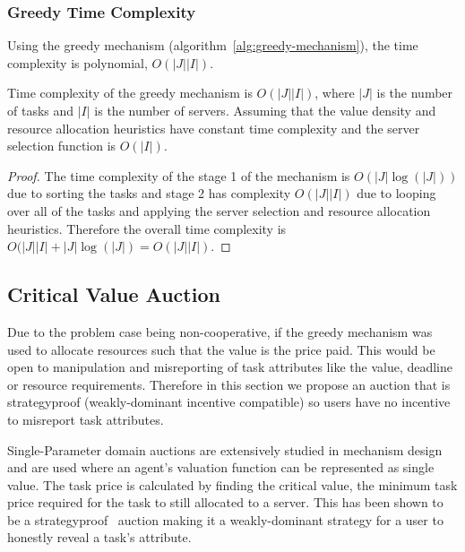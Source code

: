 \subsubsection{Greedy Time Complexity}
\label{subsubsec:greedy-time-complexity}
Using the greedy mechanism (algorithm~\ref{alg:greedy-mechanism}), the time complexity is polynomial,
$O(\left|J\right| \left|I\right|)$.
\begin{theorem}
    Time complexity of the greedy mechanism is $O(\left|J\right| \left|I\right|)$, where $\left|J\right|$ is the number
    of tasks and $\left|I\right|$ is the number of servers. Assuming that the value density and resource allocation
    heuristics have constant time complexity and the server selection function is $O(\left|I\right|)$.
\end{theorem}
\begin{proof}
    The time complexity of the stage 1 of the mechanism is $O(\left|J\right| \log(\left|J\right|))$ due to sorting the
    tasks and stage 2 has complexity $O(\left|J\right| \left|I\right|)$ due to looping over all of the tasks and
    applying the server selection and resource allocation heuristics. Therefore the overall time complexity is
    $O(\left|J\right| \left|I\right| + \left|J\right| \log(\left|J\right|) = O(\left|J\right| \left|I\right|)$.
\end{proof}

\subsection{Critical Value Auction}
\label{subsec:critical-value-auction}
Due to the problem case being non-cooperative, if the greedy mechanism was used to allocate resources such that the
value is the price paid. This would be open to manipulation and misreporting of task attributes like the value,
deadline or resource requirements. Therefore in this section we propose an auction that is strategyproof
(weakly-dominant incentive compatible) so users have no incentive to misreport task attributes.

Single-Parameter domain auctions are extensively studied in mechanism design~\cite{nisan2007algorithmic_228} and are
used where an agent's valuation function can be represented as single value. The task price is calculated by finding
the critical value, the minimum task price required for the task to still allocated to a server. This has
been shown to be a strategyproof~\cite{nisan2007algorithmic_229_230} auction making it a weakly-dominant strategy for
a user to honestly reveal a task's attribute.

